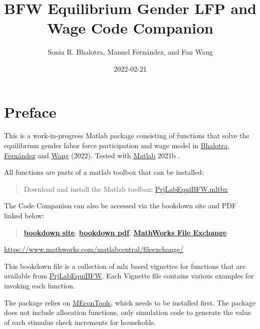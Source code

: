 \documentclass[
]{book}
\title{BFW Equilibrium Gender LFP and Wage Code Companion}
\author{Sonia R. Bhalotra, Manuel Fernández, and Fan Wang}
\date{2022-02-21}
\begin{document}
\maketitle

{
\hypersetup{linkcolor=}
\setcounter{tocdepth}{1}
\tableofcontents
}
\hypertarget{preface}{%
\chapter*{Preface}\label{preface}}

This is a work-in-progress Matlab package consisting of functions that solve the equilibrium gender labor force participation and wage model in \href{https://www.iza.org/person/2905/sonia-r-bhalotra}{Bhalotra}, \href{https://sites.google.com/view/manuelfernandezsierra}{Fernández} and \href{https://fanwangecon.github.io/}{Wang} (2022). Tested with \href{https://www.mathworks.com/products/matlab.html}{Matlab} 2021b \citep{matlab}.

All functions are parts of a matlab toolbox that can be installed:

\begin{quote}
Download and install the Matlab toolbox: \href{https://github.com/FanWangEcon/PrjLabEquiBFW/blob/main/PrjLabEquiBFW.mltbx}{PrjLabEquiBFW.mltbx}
\end{quote}

The Code Companion can also be accessed via the bookdown site and PDF linked below:

\begin{quote}
\href{https://fanwangecon.github.io/PrjLabEquiBFW/bookdown/}{\textbf{bookdown site}}, \href{https://fanwangecon.github.io/PrjLabEquiBFW/bookdown/BFW-Equilibrium-Gender-LFP-and-Wage-Code-Companion.pdf}{\textbf{bookdown pdf}}, \href{https://www.mathworks.com/matlabcentral/fileexchange/107025-prjlabequibfw}{\textbf{MathWorks File Exchange}}
\end{quote}

\url{https://www.mathworks.com/matlabcentral/fileexchange/}

This bookdown file is a collection of mlx based vignettes for functions that are available from \href{https://github.com/FanWangEcon/PrjLabEquiBFW}{PrjLabEquiBFW}. Each Vignette file contains various examples for invoking each function.

The package relies on \href{https://fanwangecon.github.io/MEconTools/}{MEconTools}, which needs to be installed first. The package does not include allocation functions, only simulation code to generate the value of each stimulus check increments for households.
\end{document}

